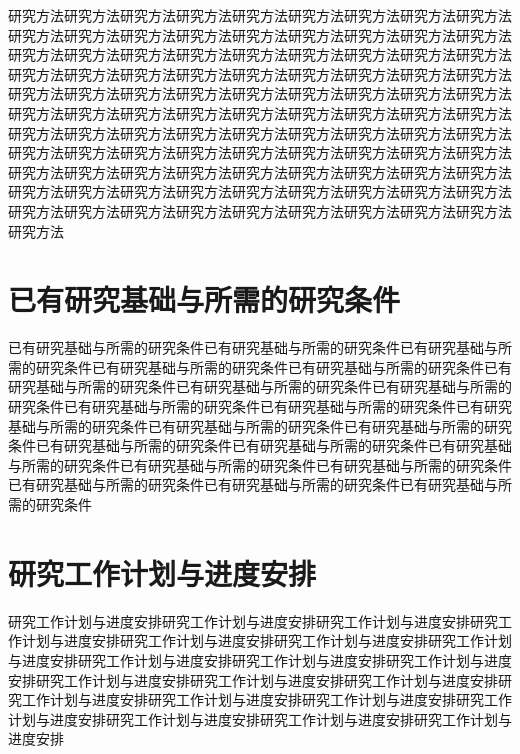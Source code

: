 研究方法研究方法研究方法研究方法研究方法研究方法研究方法研究方法研究方法研究方法研究方法研究方法研究方法研究方法研究方法研究方法研究方法研究方法研究方法研究方法研究方法研究方法研究方法研究方法研究方法研究方法研究方法研究方法研究方法研究方法研究方法研究方法研究方法研究方法研究方法研究方法研究方法研究方法研究方法研究方法研究方法研究方法研究方法研究方法研究方法研究方法研究方法研究方法研究方法研究方法研究方法研究方法研究方法研究方法研究方法研究方法研究方法研究方法研究方法研究方法研究方法研究方法研究方法研究方法研究方法研究方法研究方法研究方法研究方法研究方法研究方法研究方法研究方法研究方法研究方法研究方法研究方法研究方法研究方法研究方法研究方法研究方法研究方法研究方法研究方法研究方法研究方法研究方法研究方法研究方法研究方法研究方法研究方法研究方法研究方法研究方法研究方法研究方法研究方法研究方法

\clearpage
\section{已有研究基础与所需的研究条件}
已有研究基础与所需的研究条件已有研究基础与所需的研究条件已有研究基础与所需的研究条件已有研究基础与所需的研究条件已有研究基础与所需的研究条件已有研究基础与所需的研究条件已有研究基础与所需的研究条件已有研究基础与所需的研究条件已有研究基础与所需的研究条件已有研究基础与所需的研究条件已有研究基础与所需的研究条件已有研究基础与所需的研究条件已有研究基础与所需的研究条件已有研究基础与所需的研究条件已有研究基础与所需的研究条件已有研究基础与所需的研究条件已有研究基础与所需的研究条件已有研究基础与所需的研究条件已有研究基础与所需的研究条件已有研究基础与所需的研究条件已有研究基础与所需的研究条件

\clearpage
\section{研究工作计划与进度安排}
研究工作计划与进度安排研究工作计划与进度安排研究工作计划与进度安排研究工作计划与进度安排研究工作计划与进度安排研究工作计划与进度安排研究工作计划与进度安排研究工作计划与进度安排研究工作计划与进度安排研究工作计划与进度安排研究工作计划与进度安排研究工作计划与进度安排研究工作计划与进度安排研究工作计划与进度安排研究工作计划与进度安排研究工作计划与进度安排研究工作计划与进度安排研究工作计划与进度安排研究工作计划与进度安排研究工作计划与进度安排

\clearpage
\nocite{*}%
